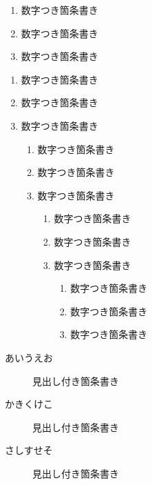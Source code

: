 \documentclass{jsarticle}
\begin{document}
    \begin{enumerate}
        \item 数字つき箇条書き
        \item 数字つき箇条書き
        \item 数字つき箇条書き
    \end{enumerate}

    \begin{enumerate}
        \item 数字つき箇条書き
        \item 数字つき箇条書き
        \item 数字つき箇条書き

        \begin{enumerate}
            \item 数字つき箇条書き
            \item 数字つき箇条書き
            \item 数字つき箇条書き

            \begin{enumerate}
                \item 数字つき箇条書き
                \item 数字つき箇条書き
                \item 数字つき箇条書き

                \begin{enumerate}
                    \item 数字つき箇条書き
                    \item 数字つき箇条書き
                    \item 数字つき箇条書き
                \end{enumerate}

            \end{enumerate}

        \end{enumerate}

    \end{enumerate}

    \begin{description}
        \item[あいうえお] 見出し付き箇条書き
        \item[かきくけこ] 見出し付き箇条書き
        \item[さしすせそ] 見出し付き箇条書き
    \end{description}


\end{document}
